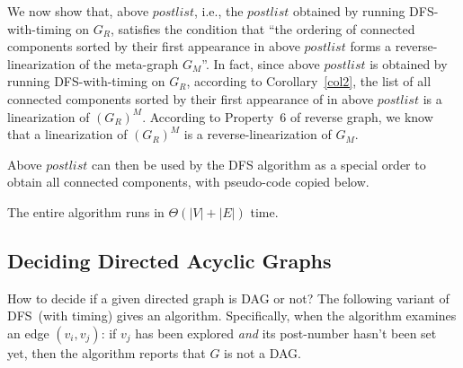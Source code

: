 \begin{minipage}{0.8\textwidth}
	\xxx
	\xxx
	\xxx
	\xxx
	\xxx
\end{minipage}

We now show that, above $postlist$, i.e., the $postlist$ obtained by running DFS-with-timing on $G_R$,
satisfies the condition that ``the ordering of connected components sorted by their first appearance in above
$postlist$ forms a reverse-linearization of the meta-graph $G_M$''.
In fact, since above $postlist$ is obtained by running DFS-with-timing on $G_R$,
according to Corollary~\ref{col2}, 
the list of all connected components sorted by their first appearance of in above $postlist$ is a linearization of $(G_R)^M$.
According to Property~6 of reverse graph, we know that a linearization of $(G_R)^M$ is a reverse-linearization of $G_M$.

Above $postlist$ can then be used by the DFS algorithm as a special order to obtain all connected components, with pseudo-code copied below.

\begin{minipage}{0.8\textwidth}
	\xxx
	\xxx
	\xxx
	\xxx
	\xxx
	\xxx
	\xxx
	\xxx
	\xxx
\end{minipage}

\begin{minipage}{0.8\textwidth}
	\xxx
	\xxx
	\xxx
	\xxx
	\xxx
	\xxx
\end{minipage}


The entire algorithm runs in $\Theta(|V| + |E|)$ time.

\subsection*{Deciding Directed Acyclic Graphs}

How to decide if a given directed graph is DAG or not?
The following variant of DFS~(with timing) gives an algorithm.
Specifically, when the algorithm examines an edge $(v_i, v_j)$:
if $v_j$ has been explored \emph{and} its post-number hasn't been set yet,
then the algorithm reports that $G$ is not a DAG.

